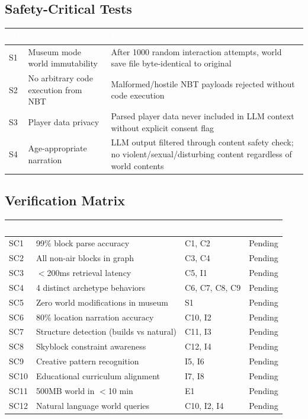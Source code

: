 \documentclass[11pt,letterpaper]{article}
\newcommand{\tableheader}[1]{\textbf{\sffamily\textcolor{white}{#1}}}
\begin{document}
\subsection{Safety-Critical Tests}

\begin{center}
\begin{tabularx}{\textwidth}{C{1cm}L{3.5cm}X}
\toprule
{}
\tableheader{ID} & \tableheader{Verifies} & \tableheader{Expected Result} \\
\midrule
S1 & Museum mode world immutability & After 1000 random interaction attempts, world save file byte-identical to original \\
S2 & No arbitrary code execution from NBT & Malformed/hostile NBT payloads rejected without code execution \\
S3 & Player data privacy & Parsed player data never included in LLM context without explicit consent flag \\
S4 & Age-appropriate narration & LLM output filtered through content safety check; no violent/sexual/disturbing content regardless of world contents \\
\bottomrule
\end{tabularx}
\end{center}

\subsection{Verification Matrix}

\begin{center}
\begin{tabularx}{\textwidth}{C{1cm}XL{2.5cm}C{1.5cm}}
\toprule
{}
\tableheader{\#} & \tableheader{Success Criterion} & \tableheader{Test IDs} & \tableheader{Status} \\
\midrule
SC1 & 99\% block parse accuracy & C1, C2 & Pending \\
SC2 & All non-air blocks in graph & C3, C4 & Pending \\
SC3 & $<$200ms retrieval latency & C5, I1 & Pending \\
SC4 & 4 distinct archetype behaviors & C6, C7, C8, C9 & Pending \\
SC5 & Zero world modifications in museum & S1 & Pending \\
SC6 & 80\% location narration accuracy & C10, I2 & Pending \\
SC7 & Structure detection (builds vs natural) & C11, I3 & Pending \\
SC8 & Skyblock constraint awareness & C12, I4 & Pending \\
SC9 & Creative pattern recognition & I5, I6 & Pending \\
SC10 & Educational curriculum alignment & I7, I8 & Pending \\
SC11 & 500MB world in $<$10 min & E1 & Pending \\
SC12 & Natural language world queries & C10, I2, I4 & Pending \\
\bottomrule
\end{tabularx}
\end{center}
\end{document}
